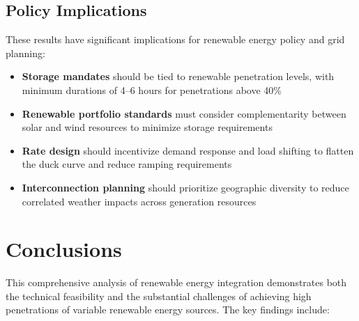 \documentclass[11pt,a4paper]{article}
\begin{document}
\subsection{Policy Implications}

These results have significant implications for renewable energy policy and grid planning:
\begin{itemize}
\item \textbf{Storage mandates} should be tied to renewable penetration levels, with minimum
durations of 4--6 hours for penetrations above 40\%
\item \textbf{Renewable portfolio standards} must consider complementarity between solar and wind
resources to minimize storage requirements
\item \textbf{Rate design} should incentivize demand response and load shifting to flatten the duck
curve and reduce ramping requirements
\item \textbf{Interconnection planning} should prioritize geographic diversity to reduce correlated
weather impacts across generation resources
\end{itemize}

\section{Conclusions}

This comprehensive analysis of renewable energy integration demonstrates both the technical
feasibility and the substantial challenges of achieving high penetrations of variable renewable
energy sources. The key findings include:
\end{document}
